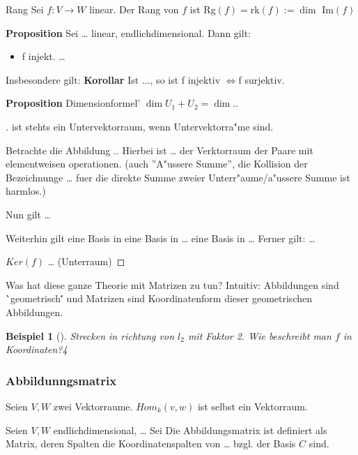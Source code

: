 \documentclass[11pt]{article}
\newtheorem{exa}{Beispiel}[section]
\begin{document}
\begin{definition}{Rang}{}
Sei $f:V\to W$ linear. Der Rang von \(f\) ist Rg$(f) = $rk$(f) := \dim$ Im$(f)$
\end{definition}

\textbf{Proposition} Sei \ldots{} linear, endlichdimensional.
Dann gilt:
\begin{itemize}
\item f injekt. \ldots{}
\end{itemize}

Insbesondere gilt: \textbf{Korollar} Ist $\ldots{}$, so ist f injektiv $\iff $f surjektiv.

\textbf{Proposition} Dimensionformel' \(\dim U_1 +U_2 =\dim..\)
\begin{proof}[] \label{}
ist stehts ein Untervektorraum, wenn Untervektorra"me sind. 

Betrachte die Abbildung .. Hierbei ist \ldots{} der Verktorraum der Paare mit
elementweisen operationen. (auch ''A"ussere Summe'', die Kollision der
Bezeichnunge \ldots{} fuer die direkte Summe zweier Unterr"aume/a"ussere Summe ist harmlos.)

Nun gilt \ldots{} 

Weiterhin gilt eine Basis in eine Basis in \ldots{} eine Basis in \ldots{}
Ferner gilt: \ldots{} 

\(Ker(f)\) \ldots{} (Unterraum)
\end{proof}

Was hat diese ganze Theorie mit Matrizen zu tun? Intuitiv: Abbildungen sind
\``geometrisch\'' und Matrizen sind Koordinatenform dieser geometrischen
Abbildungen.

\begin{exa}[] \label{}
Strecken in richtung von \(l_2\) mit Faktor 2. Wie beschreibt man \(f\) in
Koordinaten?4
\end{exa}

\subsubsection{Abbildunngsmatrix}
\label{sec:org00a1823}
\begin{definition}{}{}
Seien \(V,W\) zwei Vektorraume.
\(Hom_k(v,w)\)  ist selbst ein Vektorraum.
\end{definition}

Seien \(V, W\) endlichdimensional, \ldots{} Sei  Die Abbildungsmatrix ist definiert als
Matrix, deren Spalten die Koordinatenspalten von \ldots{} bzgl. der Basis \(C\) sind. 
\end{document}
